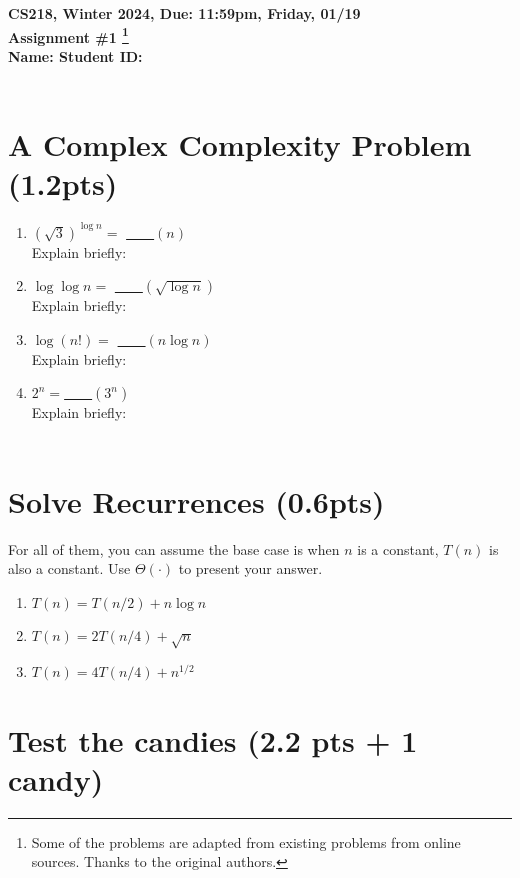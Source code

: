\documentclass{article}[12pt]
\newcommand{\deadline}{11:59pm, Friday, 01/19}
\newcommand{\assigntitle}[1]{{
  \noindent \large \bf
  CS218, Winter 2024, \hfill Due: {\deadline}\\
  Assignment \##1 \footnote{Some of the problems are adapted from existing problems from online sources. Thanks to the original authors.}\\
  Name: %
  \hspace{3.2in}
  Student ID: %
  \\
  [-.05in]
  \mbox{}\hrulefill \mbox{}\\}}
\begin{document}
\assigntitle{1}{}
\date{}



\section{A Complex Complexity Problem (1.2pts)}
\begin{center}
\begin{enumerate}
  \item $(\sqrt{3})^{\log n}=$ \underline{~~~~}$(n)$\\ Explain briefly:
  \item $\log\log n=$ \underline{~~~~}$(\sqrt{\log n})$\\ Explain briefly:
  \item $\log (n!)=$ \underline{~~~~}$(n\log n)$\\ Explain briefly:
  \item $2^n=$\underline{~~~~}$(3^n)$\\ Explain briefly: \\ ~\\
\end{enumerate}
\end{center}


\section{Solve Recurrences (0.6pts)}
For all of them, you can assume the base case is when $n$ is a constant, $T(n)$ is also a constant. Use $\Theta(\cdot)$ to present your answer.

\begin{enumerate}
  \item $T(n)=T(n/2)+n\log n$
  \item $T(n)=2T(n/4)+\sqrt{n}$
  \item $T(n)=4T(n/4) + {n}^{1/2}$
\end{enumerate}

\section{Test the candies (2.2 pts + 1 candy)}
\end{document}
